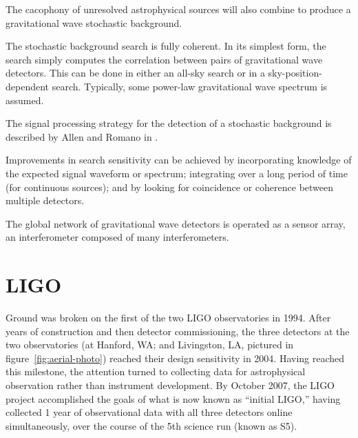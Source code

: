 \begin{itemize}
  The cacophony of unresolved astrophysical sources will also combine
  to produce a gravitational wave stochastic background.   

  The stochastic background search is fully coherent.  In its simplest
  form, the search simply computes the correlation between pairs of
  gravitational wave detectors.  This can be done in either an all-sky
  search or in a sky-position-dependent search.  Typically, some
  power-law gravitational wave spectrum is assumed.
  
  The signal processing strategy for the detection of a stochastic background
  is described by Allen and Romano in \cite{Allen1999Detecting}.
\end{itemize}

Improvements in search sensitivity can be achieved by incorporating
knowledge of the expected signal waveform or spectrum; integrating
over a long period of time (for continuous sources); and by looking
for coincidence or coherence between multiple detectors.

The global network of gravitational wave detectors is operated as a
sensor array, an interferometer composed of many interferometers.

\section{LIGO}

Ground was broken on the first of the two LIGO observatories in 1994.
After years of construction and then detector commissioning, the three
detectors at the two observatories (at Hanford, WA; and Livingston, LA, 
pictured in figure~\ref{fig:aerial-photo}) reached their design sensitivity\cite{LigoSRD} in
2004\cite{Ballmer2006LIGO}.  Having reached this milestone, the attention turned to
collecting data for astrophysical observation rather than instrument
development.  By October 2007, the LIGO project accomplished the goals
of what is now known as ``initial LIGO,'' having collected 1 year of
observational data with all three detectors online simultaneously, over
the course of the 5th science run (known as S5).

